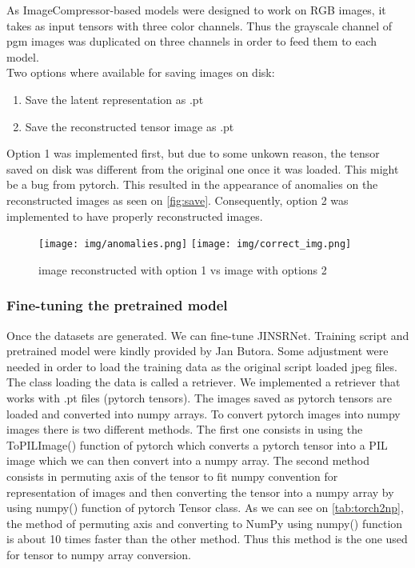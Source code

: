 \documentclass[12pt]{article}
\begin{document}
As ImageCompressor-based models were designed to work on RGB images, it takes as input tensors with three color channels. Thus the grayscale channel of pgm images was duplicated on three channels in order to feed them to each model.\\
Two options where available for saving images on disk:
\begin{enumerate}
    \item Save the latent representation as .pt
    \item Save the reconstructed tensor image as .pt
\end{enumerate}
Option 1 was implemented first, but due to some unkown reason, the tensor saved on disk was different from the original one once it was loaded. This might be a bug from pytorch. This resulted in the appearance of anomalies on the reconstructed images as seen on \autoref{fig:save}. Consequently, option 2 was implemented to have properly reconstructed images.
\begin{figure}[H]
    \texttt{[image: img/anomalies.png]}
    \texttt{[image: img/correct\_img.png]}
    \caption[Image reconstructed from tensor saved on disk]{image reconstructed with option 1 vs image with options 2}
    \label{fig:save}
\end{figure}

\subsubsection{Fine-tuning the pretrained model}
Once the datasets are generated. We can fine-tune JINSRNet.
Training script and pretrained model were kindly provided by Jan Butora. Some adjustment were needed in order to load the training data as the original script loaded jpeg files. The class loading the data is called a retriever. We implemented a retriever that works with .pt files (pytorch tensors). The images saved as pytorch tensors are loaded and converted into numpy arrays. To convert pytorch images into numpy images there is two different methods. The first one consists in using the ToPILImage() function of pytorch which converts a pytorch tensor into a PIL image which we can then convert into a numpy array. The second method consists in permuting axis of the tensor to fit numpy convention for representation of images and then converting the tensor into a numpy array by using numpy() function of pytorch Tensor class. As we can see on \autoref{tab:torch2np}, the method of permuting axis and converting to NumPy using numpy() function is about 10 times faster than the other method. Thus this method is the one used for tensor to numpy array conversion.\\
\end{document}
